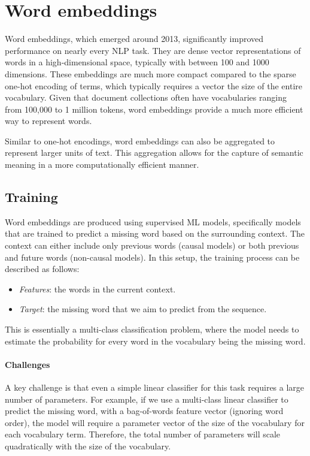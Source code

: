 \section{Word embeddings}

Word embeddings, which emerged around 2013, significantly improved performance on nearly every NLP task.
They are dense vector representations of words in a high-dimensional space, typically with between 100 and 1000 dimensions. 
These embeddings are much more compact compared to the sparse one-hot encoding of terms, which typically requires a vector the size of the entire vocabulary.
Given that document collections often have vocabularies ranging from 100,000 to 1 million tokens, word embeddings provide a much more efficient way to represent words.

Similar to one-hot encodings, word embeddings can also be aggregated to represent larger units of text. 
This aggregation allows for the capture of semantic meaning in a more computationally efficient manner.

\subsection{Training}
Word embeddings are produced using supervised ML models, specifically models that are trained to predict a missing word based on the surrounding context.
The context can either include only previous words (causal models) or both previous and future words (non-causal models).
In this setup, the training process can be described as follows:
\begin{itemize}
    \item \textit{Features}: the words in the current context.
    \item \textit{Target}: the missing word that we aim to predict from the sequence.
\end{itemize}
\noindent This is essentially a multi-class classification problem, where the model needs to estimate the probability for every word in the vocabulary being the missing word.

\paragraph*{Challenges}
A key challenge is that even a simple linear classifier for this task requires a large number of parameters.
For example, if we use a multi-class linear classifier to predict the missing word, with a bag-of-words feature vector (ignoring word order), the model will require a parameter vector of the size of the vocabulary for each vocabulary term. 
Therefore, the total number of parameters will scale quadratically with the size of the vocabulary.

